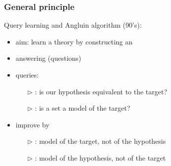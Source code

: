 \begin{frame}
\frametitle{General principle}

Query learning and Angluin algorithm (90's):
\begin{itemize}
	\item aim: learn a theory by constructing an 
	\item {} answering  (questions)
	\item queries:
		\begin{itemize}
			\item[\color{belize} $\triangleright$]
			 {\color{midnight} : is our hypothesis equivalent to the target?}
			\item[\color{belize} $\triangleright$]
			{\color{midnight} : is a set a model of the target?}
		\end{itemize}
	\item improve by 
		\begin{itemize}
			\item[\color{belize} $\triangleright$]
			{\color{midnight} : model of the target, not of the hypothesis}
			\item[\color{belize} $\triangleright$]
			{\color{midnight} : model of the hypothesis, not
			of the target}
		\end{itemize}
\end{itemize}


\end{frame}



	
	
	
	



